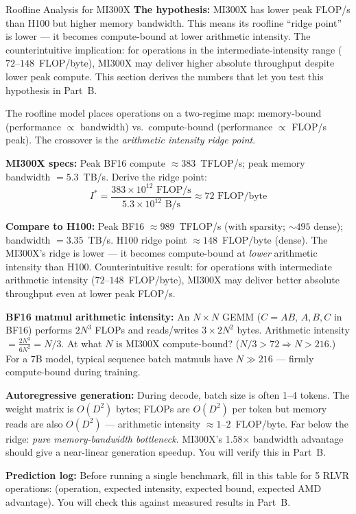 \begin{thinkfirst}{Roofline Analysis for MI300X}
\textbf{The hypothesis:} MI300X has lower peak FLOP/s than H100 but higher memory bandwidth. This means its roofline ``ridge point'' is lower --- it becomes compute-bound at lower arithmetic intensity. The counterintuitive implication: for operations in the intermediate-intensity range ($72$--$148$~FLOP/byte), MI300X may deliver higher absolute throughput despite lower peak compute. This section derives the numbers that let you test this hypothesis in Part~B.

The roofline model places operations on a two-regime map: memory-bound (performance $\propto$ bandwidth) vs.\ compute-bound (performance $\propto$ FLOP/s peak). The crossover is the \textit{arithmetic intensity ridge point}.

\textbf{MI300X specs:} Peak BF16 compute $\approx 383$~TFLOP/s; peak memory bandwidth $= 5.3$~TB/s. Derive the ridge point:
$$I^* = \frac{383 \times 10^{12} \text{ FLOP/s}}{5.3 \times 10^{12} \text{ B/s}} \approx 72 \text{ FLOP/byte}$$

\textbf{Compare to H100:} Peak BF16 $\approx 989$~TFLOP/s (with sparsity; $\sim 495$ dense); bandwidth $= 3.35$~TB/s. H100 ridge point $\approx 148$~FLOP/byte (dense). The MI300X's ridge is lower --- it becomes compute-bound at \textit{lower} arithmetic intensity than H100. Counterintuitive result: for operations with intermediate arithmetic intensity ($72$--$148$~FLOP/byte), MI300X may deliver better absolute throughput even at lower peak FLOP/s.

\textbf{BF16 matmul arithmetic intensity:} An $N \times N$ GEMM ($C = AB$, $A,B,C$ in BF16) performs $2N^3$ FLOPs and reads/writes $3 \times 2N^2$ bytes. Arithmetic intensity $= \frac{2N^3}{6N^2} = N/3$. At what $N$ is MI300X compute-bound? ($N/3 > 72 \Rightarrow N > 216$.) For a 7B model, typical sequence batch matmuls have $N \gg 216$ --- firmly compute-bound during training.

\textbf{Autoregressive generation:} During decode, batch size is often 1--4 tokens. The weight matrix is $O(D^2)$ bytes; FLOPs are $O(D^2)$ per token but memory reads are also $O(D^2)$ --- arithmetic intensity $\approx 1$--$2$~FLOP/byte. Far below the ridge: \textit{pure memory-bandwidth bottleneck}. MI300X's 1.58$\times$ bandwidth advantage should give a near-linear generation speedup. You will verify this in Part~B.

\textbf{Prediction log:} Before running a single benchmark, fill in this table for 5 RLVR operations: (operation, expected intensity, expected bound, expected AMD advantage). You will check this against measured results in Part~B.
\end{thinkfirst}

